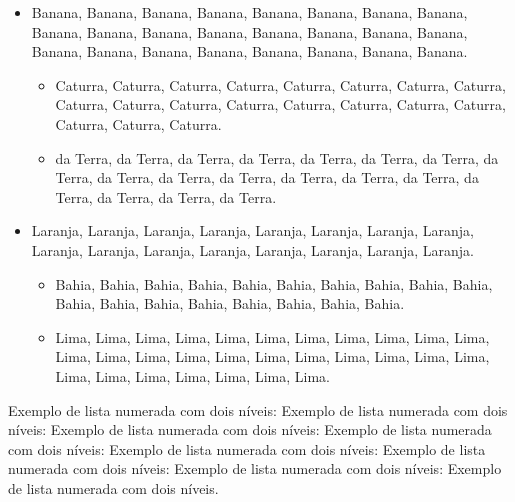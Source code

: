 \begin{itemize}

\item Banana, Banana, Banana, Banana, Banana, Banana, Banana, Banana, Banana, Banana, Banana, Banana, Banana, Banana, Banana, Banana, Banana, Banana, Banana, Banana, Banana, Banana, Banana, Banana.

\begin{itemize}

\item Caturra, Caturra, Caturra, Caturra, Caturra, Caturra, Caturra, Caturra, Caturra, Caturra, Caturra, Caturra, Caturra, Caturra, Caturra, Caturra, Caturra, Caturra, Caturra.

\item da Terra, da Terra, da Terra, da Terra, da Terra, da Terra, da Terra, da Terra, da Terra, da Terra, da Terra, da Terra, da Terra, da Terra, da Terra, da Terra, da Terra, da Terra.

\end{itemize}

\item Laranja, Laranja, Laranja, Laranja, Laranja, Laranja, Laranja, Laranja, Laranja, Laranja, Laranja, Laranja, Laranja, Laranja, Laranja, Laranja.

\begin{itemize}

\item Bahia, Bahia, Bahia, Bahia, Bahia, Bahia, Bahia, Bahia, Bahia, Bahia, Bahia, Bahia, Bahia, Bahia, Bahia, Bahia, Bahia, Bahia.

\item Lima, Lima, Lima, Lima, Lima, Lima, Lima, Lima, Lima, Lima, Lima, Lima, Lima, Lima, Lima, Lima, Lima, Lima, Lima, Lima, Lima, Lima, Lima, Lima, Lima, Lima, Lima, Lima, Lima.

\end{itemize}

\end{itemize}

Exemplo de lista numerada com dois níveis: Exemplo de lista numerada com dois níveis: Exemplo de lista numerada com dois níveis: Exemplo de lista numerada com dois níveis: Exemplo de lista numerada com dois níveis: Exemplo de lista numerada com dois níveis: Exemplo de lista numerada com dois níveis: Exemplo de lista numerada com dois níveis.


